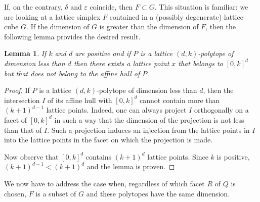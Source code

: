 \documentclass[a4paper]{article}
\newtheorem{lemma}{Lemma}
\begin{document}
If, on the contrary, $\delta$ and $\varepsilon$ coincide, then $F\subset{G}$. This situation is familiar: we are looking at a lattice simplex $F$ contained in a (possibly degenerate) lattice cube $G$. If the dimension of $G$ is greater than the dimension of $F$, then the following lemma provides the desired result.

\begin{lemma}\label{Lem.C}
If $k$ and $d$ are positive and if $P$ is a lattice $(d,k)$-polytope of dimension less than $d$ then there exists a lattice point $x$ that belongs to $[0,k]^d$ but that does not belong to the affine hull of $P$.
\end{lemma}
\begin{proof}
If $P$ is a lattice $(d,k)$-polytope of dimension less than $d$, then the intersection $I$ of its affine hull with $[0,k]^d$ cannot contain more than $(k+1)^{d-1}$ lattice points. Indeed, one can always project $I$ orthogonally on a facet of $[0,k]^d$ in such a way that the dimension of the projection is not less than that of $I$. Such a projection induces an injection from the lattice points in $I$ into the lattice points in the facet on which the projection is made.

Now observe that $[0,k]^d$ contains $(k+1)^d$ lattice points. Since $k$ is positive, $(k+1)^{d-1}<(k+1)^d$ and the lemma is proven.
\end{proof}

We now have to address the case when, regardless of which facet $R$ of $Q$ is chosen, $F$ is a subset of $G$ and these polytopes have the same dimension.
\end{document}
